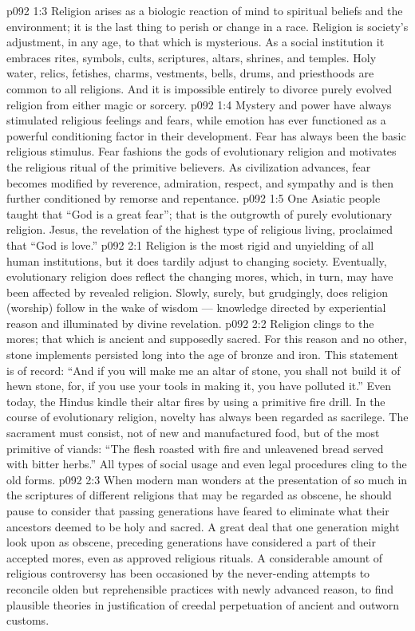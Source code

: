 \vs p092 1:3 Religion arises as a biologic reaction of mind to spiritual beliefs and the environment; it is the last thing to perish or change in a race. Religion is society’s adjustment, in any age, to that which is mysterious. As a social institution it embraces rites, symbols, cults, scriptures, altars, shrines, and temples. Holy water, relics, fetishes, charms, vestments, bells, drums, and priesthoods are common to all religions. And it is impossible entirely to divorce purely evolved religion from either magic or sorcery.
\vs p092 1:4 Mystery and power have always stimulated religious feelings and fears, while emotion has ever functioned as a powerful conditioning factor in their development. Fear has always been the basic religious stimulus. Fear fashions the gods of evolutionary religion and motivates the religious ritual of the primitive believers. As civilization advances, fear becomes modified by reverence, admiration, respect, and sympathy and is then further conditioned by remorse and repentance.
\vs p092 1:5 One Asiatic people taught that “God is a great fear”; that is the outgrowth of purely evolutionary religion. Jesus, the revelation of the highest type of religious living, proclaimed that “God is love.”
\vs p092 2:1 Religion is the most rigid and unyielding of all human institutions, but it does tardily adjust to changing society. Eventually, evolutionary religion does reflect the changing mores, which, in turn, may have been affected by revealed religion. Slowly, surely, but grudgingly, does religion (worship) follow in the wake of wisdom --- knowledge directed by experiential reason and illuminated by divine revelation.
\vs p092 2:2 Religion clings to the mores; that which  is ancient and supposedly sacred. For this reason and no other, stone implements persisted long into the age of bronze and iron. This statement is of record: “And if you will make me an altar of stone, you shall not build it of hewn stone, for, if you use your tools in making it, you have polluted it.” Even today, the Hindus kindle their altar fires by using a primitive fire drill. In the course of evolutionary religion, novelty has always been regarded as sacrilege. The sacrament must consist, not of new and manufactured food, but of the most primitive of viands: “The flesh roasted with fire and unleavened bread served with bitter herbs.” All types of social usage and even legal procedures cling to the old forms.
\vs p092 2:3 When modern man wonders at the presentation of so much in the scriptures of different religions that may be regarded as obscene, he should pause to consider that passing generations have feared to eliminate what their ancestors deemed to be holy and sacred. A great deal that one generation might look upon as obscene, preceding generations have considered a part of their accepted mores, even as approved religious rituals. A considerable amount of religious controversy has been occasioned by the never\hyp{}ending attempts to reconcile olden but reprehensible practices with newly advanced reason, to find plausible theories in justification of creedal perpetuation of ancient and outworn customs.
